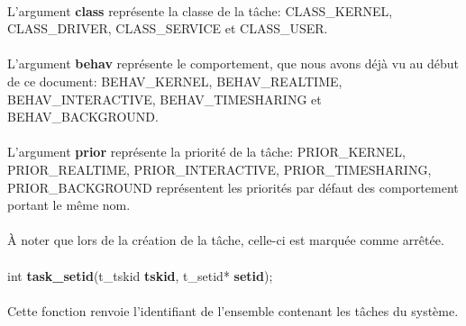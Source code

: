 \documentclass[10pt,a4wide]{article}
\begin{document}
\paragraph{}

L'argument \textbf{class} repr\'esente la classe de la t\^ache:
CLASS\_KERNEL, CLASS\_DRIVER, CLASS\_SERVICE et CLASS\_USER.

\paragraph{}

L'argument \textbf{behav} repr\'esente le comportement, que nous avons
d\'ej\`a vu au d\'ebut de ce document: BEHAV\_KERNEL, BEHAV\_REALTIME,
BEHAV\_INTERACTIVE, BEHAV\_TIMESHARING et BEHAV\_BACKGROUND.

\paragraph{}

L'argument \textbf{prior} repr\'esente la priorit\'e de la t\^ache:
PRIOR\_KERNEL, PRIOR\_REALTIME, PRIOR\_INTERACTIVE, PRIOR\_TIMESHARING,
PRIOR\_BACKGROUND repr\'esentent les priorit\'es par d\'efaut des
comportement portant le m\^eme nom.

\paragraph{}

\`A noter que lors de la cr\'eation de la t\^ache, celle-ci est marqu\'ee
comme arr\^et\'ee.

\paragraph{}

\hspace{1.5cm}int \textbf{task\_setid}(t\_tskid \textbf{tskid},
                                       t\_setid* \textbf{setid});

\paragraph{}

Cette fonction renvoie l'identifiant de l'ensemble contenant les t\^aches
du syst\`eme.

\paragraph{}
\end{document}

